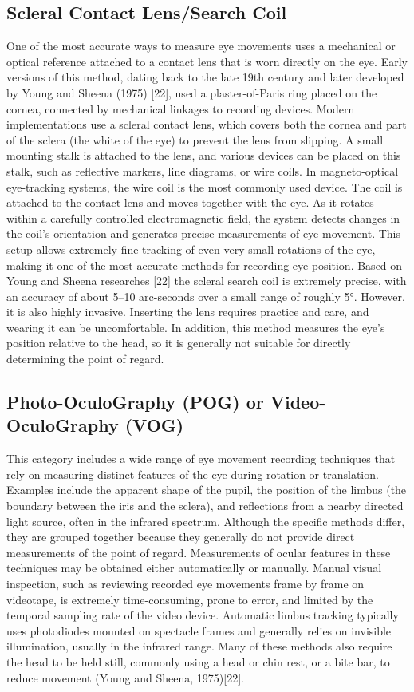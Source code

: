 \documentclass[12pt]{report}
\begin{document}
\subsection{Scleral Contact Lens/Search Coil}

One of the most accurate ways to measure eye movements uses a mechanical or optical reference attached to a contact lens that is worn directly on the eye. 
Early versions of this method, dating back to the late 19th century and later developed by Young and Sheena (1975) [22], used a plaster-of-Paris ring placed on the cornea, connected by mechanical linkages to recording devices.
Modern implementations use a scleral contact lens, which covers both the cornea and part of the sclera (the white of the eye) to prevent the lens from slipping.
A small mounting stalk is attached to the lens, and various devices can be placed on this stalk, such as reflective markers, line diagrams, or wire coils.
In magneto-optical eye-tracking systems, the wire coil is the most commonly used device. The coil is attached to the contact lens and moves together with the eye. 
As it rotates within a carefully controlled electromagnetic field, the system detects changes in the coil's orientation and generates precise measurements of eye movement. This setup allows extremely fine tracking of even very small rotations of the eye, making it one of the most accurate methods for recording eye position.
Based on Young and Sheena researches [22] the scleral search coil is extremely precise, with an accuracy of about 5–10 arc-seconds over a small range of roughly 5°. 
However, it is also highly invasive. 
Inserting the lens requires practice and care, and wearing it can be uncomfortable. 
In addition, this method measures the eye's position relative to the head, so it is generally not suitable for directly determining the point of regard.
\sloppy
\subsection{Photo-OculoGraphy (POG) or Video-OculoGraphy (VOG)}
\fussy
This category includes a wide range of eye movement recording techniques that rely on measuring distinct features of the eye during rotation or translation. 
Examples include the apparent shape of the pupil, the position of the limbus (the boundary between the iris and the sclera), and reflections from a nearby directed light source, often in the infrared spectrum. 
Although the specific methods differ, they are grouped together because they generally do not provide direct measurements of the point of regard. 
Measurements of ocular features in these techniques may be obtained either automatically or manually.
Manual visual inspection, such as reviewing recorded eye movements frame by frame on videotape, is extremely time-consuming, prone to error, and limited by the temporal sampling rate of the video device.
Automatic limbus tracking typically uses photodiodes mounted on spectacle frames and generally relies on invisible illumination, usually in the infrared range. Many of these methods also require the head to be held still, commonly using a head or chin rest, or a bite bar, to reduce movement (Young and Sheena, 1975)[22].
\end{document}
